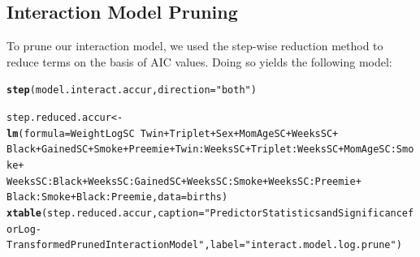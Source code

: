 \documentclass{article}\usepackage[]{graphicx}\usepackage[]{xcolor}
\makeatletter
\newcommand{\hlstr}[1]{\textcolor[rgb]{0.192,0.494,0.8}{#1}}%
\newcommand{\hlopt}[1]{\textcolor[rgb]{0,0,0}{#1}}%
\newcommand{\hlstd}[1]{\textcolor[rgb]{0.345,0.345,0.345}{#1}}%
\newcommand{\hlkwb}[1]{\textcolor[rgb]{0.69,0.353,0.396}{#1}}%
\newcommand{\hlkwc}[1]{\textcolor[rgb]{0.333,0.667,0.333}{#1}}%
\newcommand{\hlkwd}[1]{\textcolor[rgb]{0.737,0.353,0.396}{\textbf{#1}}}%
\newenvironment{kframe}{%
 \def\at@end@of@kframe{}%
 \ifinner\ifhmode%
  \def\at@end@of@kframe{\end{minipage}}%
  \begin{minipage}{\columnwidth}%
 \fi\fi%
 \def\FrameCommand##1{\hskip\@totalleftmargin \hskip-\fboxsep
 \colorbox{shadecolor}{##1}\hskip-\fboxsep
     \hskip-\linewidth \hskip-\@totalleftmargin \hskip\columnwidth}%
 \MakeFramed {\advance\hsize-\width
   \@totalleftmargin\z@ \linewidth\hsize
   \@setminipage}}%
 {\par\unskip\endMakeFramed%
 \at@end@of@kframe}
\newenvironment{knitrout}{}{} %
\makeatother
\begin{document}
\subsection{Interaction Model Pruning}

To prune our interaction model, we used the step-wise reduction method to reduce terms on the basis of AIC values. Doing so yields the following model:

\begin{knitrout}
\color{fgcolor}\begin{kframe}
\begin{alltt}
\hlkwd{step}\hlstd{(model.interact.accur,} \hlkwc{direction}\hlstd{=}\hlstr{"both"}\hlstd{)}
\end{alltt}
\end{kframe}
\end{knitrout}
\begin{knitrout}
\color{fgcolor}\begin{kframe}
\begin{alltt}
\hlstd{step.reduced.accur} \hlkwb{<-} \hlkwd{lm}\hlstd{(}\hlkwc{formula} \hlstd{= WeightLogSC} \hlopt{~} \hlstd{Twin} \hlopt{+} \hlstd{Triplet} \hlopt{+} \hlstd{Sex} \hlopt{+} \hlstd{MomAgeSC} \hlopt{+} \hlstd{WeeksSC} \hlopt{+}
                  \hlstd{Black} \hlopt{+} \hlstd{GainedSC} \hlopt{+} \hlstd{Smoke} \hlopt{+} \hlstd{Preemie} \hlopt{+} \hlstd{Twin}\hlopt{:}\hlstd{WeeksSC} \hlopt{+} \hlstd{Triplet}\hlopt{:}\hlstd{WeeksSC} \hlopt{+} \hlstd{MomAgeSC}\hlopt{:}\hlstd{Smoke} \hlopt{+}
                  \hlstd{WeeksSC}\hlopt{:}\hlstd{Black} \hlopt{+} \hlstd{WeeksSC}\hlopt{:}\hlstd{GainedSC} \hlopt{+} \hlstd{WeeksSC}\hlopt{:}\hlstd{Smoke} \hlopt{+} \hlstd{WeeksSC}\hlopt{:}\hlstd{Preemie} \hlopt{+}
                  \hlstd{Black}\hlopt{:}\hlstd{Smoke} \hlopt{+} \hlstd{Black}\hlopt{:}\hlstd{Preemie,} \hlkwc{data} \hlstd{= births)}
\hlkwd{xtable}\hlstd{(step.reduced.accur,} \hlkwc{caption}\hlstd{=}\hlstr{"Predictor Statistics and Significance for Log-Transformed Pruned Interaction Model"}\hlstd{,} \hlkwc{label}\hlstd{=}\hlstr{"interact.model.log.prune"}\hlstd{)}
\end{alltt}
\end{kframe}
\end{knitrout}
\end{document}
